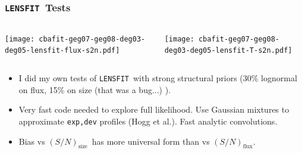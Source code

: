 \documentclass{beamer}
\newcommand{\snT}{$(S/N)_{\textrm{size}}$}
\newcommand{\snflux}{$(S/N)_{\textrm{flux}}$}
\newcommand{\lensfit}{\texttt{LENSFIT}}
\begin{document}
\frame
{
    \frametitle{\lensfit\ Tests}

    \begin{columns}
        
        \begin{column}{0.5\textwidth}
            \texttt{[image: cbafit-geg07-geg08-deg03-deg05-lensfit-flux-s2n.pdf]}
        \end{column}

        \begin{column}{0.5\textwidth}
            \texttt{[image: cbafit-geg07-geg08-deg03-deg05-lensfit-T-s2n.pdf]}
        \end{column}
    \end{columns}

    \fontsize{8}{0.8\baselineskip}
    \begin{itemize}

        \item I did my own tests of \lensfit\ with strong structural priors
            (30\% lognormal on flux, 15\% on size (that was a bug...) ).

        \item Very fast code needed to explore full likelihood.  Use Gaussian
            mixtures to approximate \texttt{exp,dev} profiles (Hogg et al.).
            Fast analytic convolutions.

        \item Bias vs \snT\ has more universal form than vs \snflux.
    \end{itemize}

}

\end{document}
